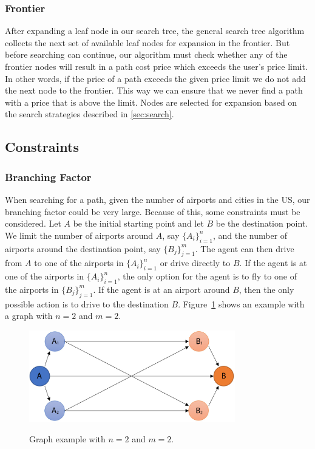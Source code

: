 \documentclass[11pt]{article}
\begin{document}
\subsubsection{Frontier}

After expanding a leaf node in our search tree, the general search tree algorithm collects the next set of available leaf nodes for expansion in the frontier. But before searching can continue, our algorithm must check whether any of the frontier nodes will result in a path cost price which exceeds the user's price limit. In other words, if the price of a path exceeds the given price limit we do not add the next node to the frontier. This way we can ensure that we never find a path with a price that is above the limit. Nodes are selected for expansion based on the search strategies described in \ref{sec:search}.

\subsection{Constraints}

\subsubsection{Branching Factor}

When searching for a path, given the number of airports and cities in the US, our branching factor could be very large. Because of this, some constraints must be considered. Let $A$ be the initial starting point and let $B$ be the destination point. We limit the number of airports around $A$, say $\{ A_i \}_{i=1}^n$, and the number of airports around the destination point, say $\{ B_j \}_{j=1}^m$. The agent can then drive from $A$ to one of the airports in $\{ A_i \}_{i=1}^n$ or drive directly to $B$. If the agent is at one of the airports in $\{ A_i \}_{i=1}^n$, the only option for the agent is to fly to one of the airports in $\{ B_j \}_{j=1}^m$. If the agent is at an airport around $B$, then the only possible action is to drive to the destination $B$. Figure~\ref{fig:graph_example} shows an example with a graph with $n = 2$ and $m = 2$.
\begin{figure}[!ht]
  \caption{Graph example with $n=2$ and $m=2$.}
  \centering
  \includegraphics[width=0.8\textwidth]{Graph_example_n2}
  \label{fig:graph_example}
\end{figure}
\end{document}
